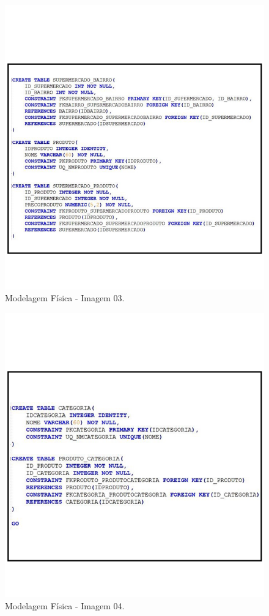 \begin{figure}[H]
   	\centering
    \caption{Modelagem Física - Imagem 03.}
    \includegraphics[scale=0.8]{Imagens/ModelagemFisica03.png}
\end{figure}

\begin{figure}[H]
   	\centering
    \caption{Modelagem Física - Imagem 04.}
    \includegraphics[scale=0.8]{Imagens/ModelagemFisica04.png}
\end{figure}

